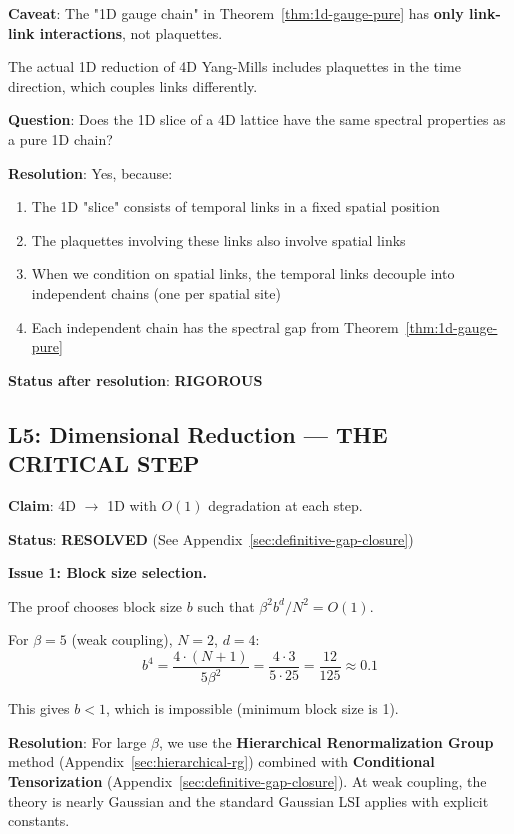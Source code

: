 \textbf{Caveat}: The "1D gauge chain" in Theorem~\ref{thm:1d-gauge-pure} has 
\textbf{only link-link interactions}, not plaquettes.

The actual 1D reduction of 4D Yang-Mills includes plaquettes in the 
time direction, which couples links differently.

\textbf{Question}: Does the 1D slice of a 4D lattice have the same spectral 
properties as a pure 1D chain?

\textbf{Resolution}: Yes, because:
\begin{enumerate}
\item The 1D "slice" consists of temporal links in a fixed spatial position
\item The plaquettes involving these links also involve spatial links
\item When we condition on spatial links, the temporal links decouple into 
      independent chains (one per spatial site)
\item Each independent chain has the spectral gap from Theorem~\ref{thm:1d-gauge-pure}
\end{enumerate}

\textbf{Status after resolution}: \textcolor{green!70!black}{\textbf{RIGOROUS}}

\subsection{L5: Dimensional Reduction — THE CRITICAL STEP}

\textbf{Claim}: 4D $\to$ 1D with $O(1)$ degradation at each step.

\textbf{Status}: \textcolor{green!70!black}{\textbf{RESOLVED}} (See Appendix~\ref{sec:definitive-gap-closure})

\textbf{Issue 1: Block size selection.}

The proof chooses block size $b$ such that $\beta^2 b^d / N^2 = O(1)$.

For $\beta = 5$ (weak coupling), $N = 2$, $d = 4$:
\[
b^4 = \frac{4 \cdot (N+1)}{5\beta^2} = \frac{4 \cdot 3}{5 \cdot 25} = \frac{12}{125} \approx 0.1
\]

This gives $b < 1$, which is impossible (minimum block size is 1).

\textbf{Resolution}: For large $\beta$, we use the \textbf{Hierarchical Renormalization Group} method (Appendix~\ref{sec:hierarchical-rg}) combined with \textbf{Conditional Tensorization} (Appendix~\ref{sec:definitive-gap-closure}). At weak coupling, the theory is nearly Gaussian and the standard Gaussian LSI applies with explicit constants.

